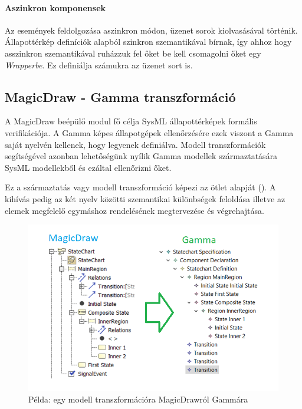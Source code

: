 \paragraph{Aszinkron komponensek} Az események feldolgozása aszinkron módon, üzenet sorok kiolvasásával történik. Állapottérkép definíciók alapból szinkron szemantikával bírnak, így ahhoz hogy asszinkron szemantikával ruházzuk fel őket be kell csomagolni őket egy \emph{Wrapperbe}. Ez definiálja számukra az üzenet sort is.


\subsection{MagicDraw - Gamma transzformáció}

A MagicDraw beépülő modul fő célja SysML állapottérképek formális verifikációja. A Gamma képes állapotgépek ellenőrzésére ezek viszont a Gamma saját nyelvén kellenek, hogy legyenek definiálva. Modell transzformációk segítségével azonban lehetőségünk nyílik Gamma modellek származtatására SysML modellekből és ezáltal ellenőrizni őket.

Ez a származtatás vagy modell transzformáció képezi az ötlet alapját (). A kihívás pedig az két nyelv közötti szemantikai különbségek feloldása illetve az elemek megfelelő egymáshoz rendelésének megtervezése és végrehajtása.

\begin{figure}[!ht]
	\centering
	\includegraphics[width=150mm, keepaspectratio]{figures/preliminaries/md-g.png}
	\caption{Példa: egy modell transzformációra MagicDrawról Gammára}
	\label{fig:preliminaries-md-g}
\end{figure}

